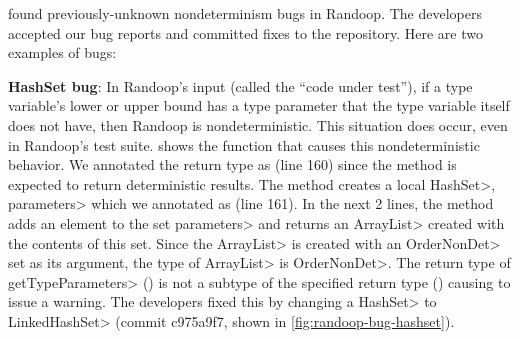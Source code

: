 \TheDeterminismChecker found \numRandoopBugs previously-unknown
nondeterminism bugs in Randoop.
The developers accepted our bug reports and committed fixes to the repository. 
Here are two examples
of bugs:

    \textbf{HashSet bug}: In Randoop's input (called the ``code under test''),
    if a type variable's lower or upper
    bound has a type parameter that the type variable itself does not have,
    then Randoop is nondeterministic.
    This situation does occur, even in Randoop's test suite.
     shows the function that causes this nondeterministic behavior.
    We annotated the return type as  (line 160) since the method 
    is expected to return deterministic results. The method creates a local \<HashSet>, \<parameters> 
    which we annotated as  (line 161). In the next 2 lines,
    the method adds an element to the set \<parameters> and returns an \<ArrayList> created with the
    contents of this set. Since the \<ArrayList> is created with an \<OrderNonDet> set as
    its argument, the type of \<ArrayList> is \<OrderNonDet>. The return type of \<getTypeParameters> 
    () is not a subtype of the specified return type 
    () causing \theDeterminismChecker to issue a warning.
    The developers fixed this by changing a \<HashSet> to \<LinkedHashSet>
    (commit c975a9f7, shown in \cref{fig:randoop-bug-hashset}).
    
    
    
